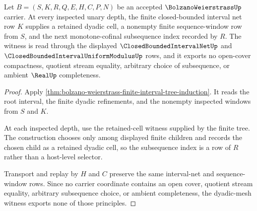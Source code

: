 \begin{theorem}
\label{thm:bolzano-weierstrass-dyadic-mesh-subsequence-witness}
Let $B=(S,K,R,Q,E,H,C,P,N)$ be an accepted $\BolzanoWeierstrassUp$ carrier. At every inspected unary depth, the finite closed-bounded interval net row $K$ supplies a retained dyadic cell, a nonempty finite sequence-window row from $S$, and the next monotone-cofinal subsequence index recorded by $R$. The witness is read through the displayed $\ClosedBoundedIntervalNetUp$ and $\ClosedBoundedIntervalUniformModulusUp$ rows, and it exports no open-cover compactness, quotient stream equality, arbitrary choice of subsequence, or ambient $\RealUp$ completeness.
\end{theorem}
\begin{proof}
Apply \autoref{thm:bolzano-weierstrass-finite-interval-tree-induction}. It reads the root interval, the finite dyadic refinements, and the nonempty inspected windows from $S$ and $K$.

At each inspected depth, use the retained-cell witness supplied by the finite tree. The construction chooses only among displayed finite children and records the chosen child as a retained dyadic cell, so the subsequence index is a row of $R$ rather than a host-level selector.

Transport and replay by $H$ and $C$ preserve the same interval-net and sequence-window rows. Since no carrier coordinate contains an open cover, quotient stream equality, arbitrary subsequence choice, or ambient completeness, the dyadic-mesh witness exports none of those principles.
\end{proof}

